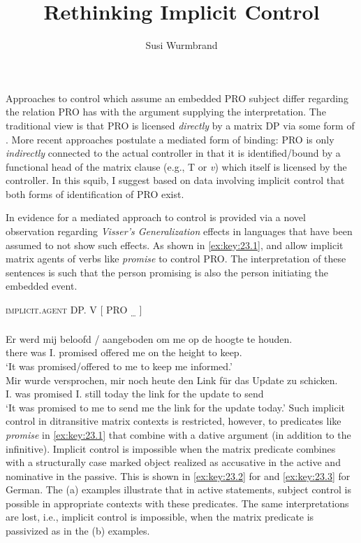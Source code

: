 \documentclass[output=paper]{langsci/langscibook}
\author{Susi Wurmbrand\affiliation{University of Vienna}}
\title{Rethinking Implicit Control}
\begin{document}
\glsresetall

\noindent Approaches to control which assume an embedded PRO subject differ
regarding the relation PRO has with the argument supplying the interpretation.
The traditional view is that PRO is licensed \emph{directly} by a matrix DP via
some form of . More recent approaches postulate a mediated form of
binding: PRO is only \emph{indirectly} connected to the actual controller in
that it is identified/bound by a functional head of the matrix clause (e.g., T
or \emph{v}) which itself is licensed by the controller. In this squib, I
suggest based on data involving implicit control that both forms of
identification of PRO exist.

In \textcite{vanUrk2013} evidence for a mediated approach to control is
provided via a novel observation regarding \emph{Visser’s Generalization}
effects in languages that have been assumed to not show such effects. As shown
in \eqref{ex:key:23.1},  and  allow implicit matrix
agents of verbs like \emph{promise} to control PRO. The interpretation of these
sentences is such that the person promising is also the person initiating the
embedded event.\newpage

\ea\label{ex:key:23.1}
    \textsc{implicit.agent}  DP.\Dat{}  V  [\textsubscript{\Inf{}}  PRO\textsubscript{ …}  ]\\
    \ea\label{ex:key:23.1a}  \parencite[171, (8)]{vanUrk2013}\\
        \sn
		\gll Er  werd  mij  beloofd / aangeboden  om  me  op de hoogte  te houden.\\
                there  was  I.\Dat{}  promised {} offered  \Comp{}  me  on the height  to keep.\textsc{\Inf{}}\\
		\glt ‘It was promised/offered to me to keep me informed.’
    \ex\label{ex:key:23.1b}  \parencite[171, (9a)]{vanUrk2013}\\
        \sn
		\gll Mir  wurde  versprochen,  mir  noch heute  den Link für das Update  zu schicken.\\
			I.\Dat{}  was  promised  I.\Dat{}  still today  the link for the update  to send\\
		\glt ‘It was promised to me to send me the link for the update today.’
	\z
\z
%
Such implicit control in ditransitive matrix contexts is restricted, however,
to predicates like \emph{promise} in \eqref{ex:key:23.1} that combine with a dative argument
(in addition to the infinitive). Implicit control is impossible when the matrix
predicate combines with a structurally case marked object realized as
accusative in the active and nominative in the passive.
This is shown in \eqref{ex:key:23.2} for  and \eqref{ex:key:23.3} for German. The (a) examples
illustrate that in active statements, subject control is possible in
appropriate contexts with these predicates. The same interpretations are lost,
i.e., implicit control is impossible, when the matrix predicate is passivized
as in the (b) examples.
\end{document}
